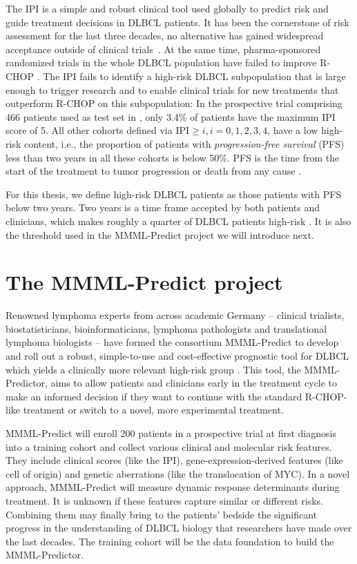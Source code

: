 The IPI is a simple and robust clinical tool used globally to predict risk and guide 
treatment decisions in DLBCL patients. It has been the cornerstone of risk assessment for the last 
three decades, no alternative has gained widespread acceptance outside of clinical 
trials~\citep{ipi-stay-strong}. 
At the same time, pharma-sponsored randomized trials in the whole DLBCL population have failed to
improve R-CHOP \cite{susanibar21}. The IPI fails to identify a high-risk DLBCL subpopulation that is 
large enough to trigger research and to enable clinical trials for new treatments that outperform 
R-CHOP on this subpopulation: In the prospective trial comprising \num{466} patients used as test 
set in \citep{staiger20}, only \num{3.4}\% of patients have the maximum IPI score of 5. All other 
cohorts defined via $\text{IPI} \geq i, i = 0, 1, 2, 3, 4$, have a low high-risk content, i.e.,  
the proportion of patients with 
\textit{progression-free survival} (PFS) less than two years in all these cohorts is below 
\num{50}\%. PFS is the time from the start of the treatment to tumor progression or death from any 
cause \cite{saad09}.

For this thesis, we define high-risk DLBCL patients as those patients with PFS below two years. 
Two years is a time 
frame accepted by both patients and clinicians, which makes roughly a quarter of DLBCL patients 
high-risk \cite{staiger20}. It is also the threshold used in the MMML-Predict project we will 
introduce next.

\section{The MMML-Predict project} \label{sec:intro-mmml}

Renowned lymphoma experts from across academic Germany -- clinical trialists, biostatisticians, 
bioinformaticians, lymphoma pathologists and translational lymphoma biologists -- have formed the 
consortium MMML-Predict to develop and roll out a robust, simple-to-use and cost-effective 
prognostic tool for DLBCL 
which yields a clinically more relevant high-risk group \cite{mmml-chapuy,mmml-idw}. This tool, the 
MMML-Predictor, aims to allow
patients and clinicians early in the treatment cycle to make an informed decision if they want to 
continue with the standard R-CHOP-like treatment or switch to a novel, more experimental treatment. 

MMML-Predict will enroll \num{200} patients in a prospective trial at first 
diagnosis into a training cohort and collect various clinical and molecular risk features.
They include clinical scores (like the IPI), gene-expression-derived features (like cell of origin) 
and genetic aberrations (like the translocation of MYC). 
In a novel approach, MMML-Predict will measure dynamic response determinants during treatment. It is 
unknown if these features capture similar or different 
risks. Combining them may finally bring to the patients' bedside the significant progress in the 
understanding of DLBCL biology that researchers have made over the last decades. The training 
cohort will be the data foundation to build the MMML-Predictor.

